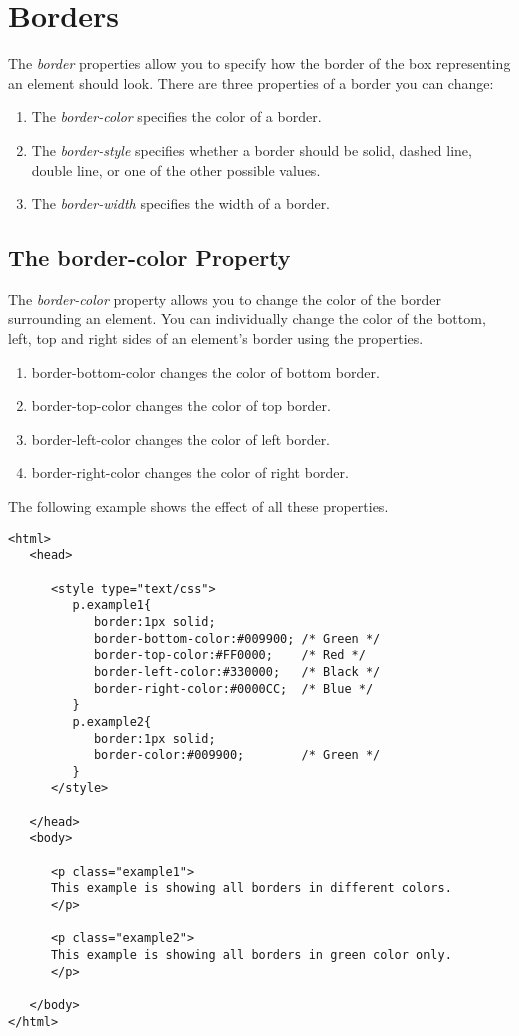 \documentclass[a4paper,oneside]{book}
\numberwithin{equation}{chapter}
\begin{document}
\section{Borders}
The \textit{border} properties allow you to specify how the border of the box representing an element should look. There are three properties of a border you can change:
\begin{enumerate}
\item The \textit{border-color} specifies the color of a border.
\item The \textit{border-style} specifies whether a border should be solid, dashed line, double line, or one of the other possible values.
\item The \textit{border-width} specifies the width of a border.
\end{enumerate}
\subsection{The border-color Property}
The \textit{border-color} property allows you to change the color of the border surrounding an element. You can individually change the color of the bottom, left, top and right sides of an element's border using the properties.
\begin{enumerate}
\item border-bottom-color changes the color of bottom border.
\item border-top-color changes the color of top border.
\item border-left-color changes the color of left border.
\item border-right-color changes the color of right border.
\end{enumerate}
The following example shows the effect of all these properties.
\begin{verbatim}
<html>
   <head>
   
      <style type="text/css">
         p.example1{
            border:1px solid;
            border-bottom-color:#009900; /* Green */
            border-top-color:#FF0000;    /* Red */
            border-left-color:#330000;   /* Black */
            border-right-color:#0000CC;  /* Blue */
         }
         p.example2{
            border:1px solid;
            border-color:#009900;        /* Green */
         }
      </style>
      
   </head>
   <body>
   
      <p class="example1">
      This example is showing all borders in different colors.
      </p>
      
      <p class="example2">
      This example is showing all borders in green color only.
      </p>
      
   </body>
</html> 
\end{verbatim}
\end{document}
